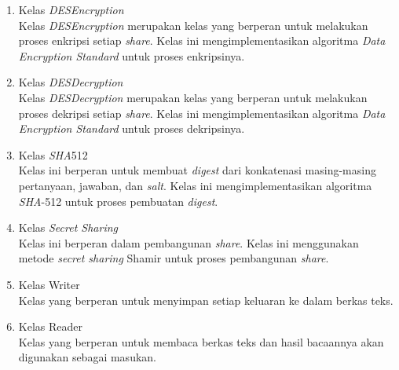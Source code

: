 \begin{enumerate}
	\item Kelas \textit{DESEncryption} \\
	Kelas \textit{DESEncryption} merupakan kelas yang berperan untuk melakukan proses enkripsi setiap \textit{share}. Kelas ini mengimplementasikan algoritma \textit{Data Encryption Standard} untuk proses enkripsinya.
	\item Kelas \textit{DESDecryption} \\
	Kelas \textit{DESDecryption} merupakan kelas yang berperan untuk melakukan proses dekripsi setiap \textit{share}. Kelas ini mengimplementasikan algoritma \textit{Data Encryption Standard} untuk proses dekripsinya.
	\item Kelas \textit{SHA}512 \\
	Kelas ini berperan untuk membuat \textit{digest} dari konkatenasi masing-masing pertanyaan, jawaban, dan \textit{salt}. Kelas ini mengimplementasikan algoritma \textit{SHA}-512 untuk proses pembuatan \textit{digest}.
	\item Kelas \textit{Secret Sharing} \\
	Kelas ini berperan dalam pembangunan \textit{share}. Kelas ini menggunakan metode \textit{secret sharing} Shamir untuk proses pembangunan \textit{share}.
	\item Kelas Writer \\
	Kelas yang berperan untuk menyimpan setiap keluaran ke dalam berkas teks.
	\item Kelas Reader \\
	Kelas yang berperan untuk membaca berkas teks dan hasil bacaannya akan digunakan sebagai masukan.
\end{enumerate}